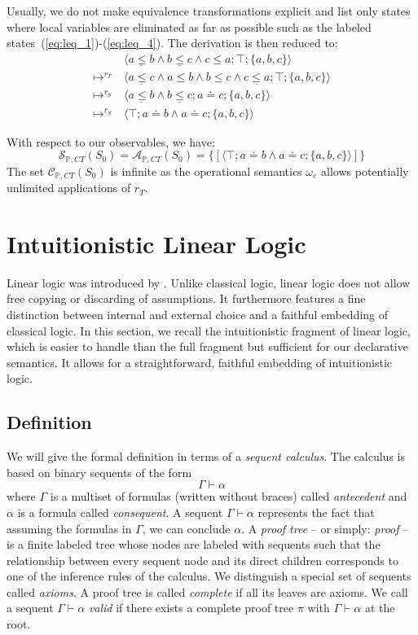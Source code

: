 \documentclass[acmtocl]{acmtrans2m}
\newcommand\state[1]{\langle #1 \rangle}
\newcommand{\bbP}{\ensuremath{\mathbb{P}}}
\newcommand{\cA}{\ensuremath{\mathcal{A}}}
\newcommand{\cS}{\ensuremath{\mathcal{S}}}
\newcommand{\cC}{\ensuremath{\mathcal{C}}}
\newcommand{\oesq}{\ensuremath{\omega_{e}}}
\begin{document}
\begin{example}
Usually, we do not make equivalence transformations explicit and list only
states where local variables are eliminated as far as possible such as the
labeled states~(\ref{eq:leq_1})-(\ref{eq:leq_4}). The derivation is then reduced
to:
\setcounter{equation}{0}
\begin{align}
& \state{\underline{a\leq b} \wedge \underline{b\leq c} \wedge c\leq a;\top;\{a,b,c\}} \\
\mapsto^{r_T}\: & \state{\underline{a\leq c} \wedge a\leq b \wedge b\leq c \wedge \underline{c\leq
a};\top;\{a,b,c\}} \\
\mapsto^{r_S}\: & \state{\underline{a\leq b} \wedge \underline{b\leq c};a\doteq c;\{a,b,c\}}
\\
\mapsto^{r_S}\: & \state{\top;a\doteq b \wedge a\doteq c;\{a,b,c\}}
\end{align}
\end{example}

With respect to our observables, we have:
\[
\cS_{\bbP,CT}(S_0) = \cA_{\bbP,CT}(S_0) =
\{[\state{\top;a\doteq b\wedge a\doteq c;\{a,b,c\}}]\}
\]
The set $\cC_{\bbP,CT}(S_0)$ is infinite
as the operational semantics $\oesq$ allows potentially unlimited applications of $r_T$.

\section{Intuitionistic Linear Logic}
  \label{sec:ill}

Linear logic was introduced by
. Unlike classical logic, linear logic does
not allow free copying or discarding of assumptions. It furthermore features a fine
distinction between internal and external choice and a faithful embedding of
classical logic. In this section, we recall the intuitionistic fragment of linear
logic, which is easier to handle than the full fragment but sufficient for
our declarative semantics. It allows for a straightforward, faithful embedding of
intuitionistic logic.

\subsection{Definition}

We will give the formal definition in terms of a \emph{sequent calculus}. The
calculus is based on binary sequents of the form \[
  \Gamma \vdash \alpha
\] where $\Gamma$ is a multiset of formulas (written without braces) called
\emph{antecedent} and $\alpha$ is a formula called \emph{consequent}. A sequent
$\Gamma \vdash \alpha$ represents the fact that assuming the formulas in
$\Gamma$, we can conclude $\alpha$. A \emph{proof tree} -- or simply:
\emph{proof} -- is a finite labeled tree whose nodes are labeled with
sequents such that the relationship between every sequent node and its direct
children corresponds to one of the inference rules of the calculus. We
distinguish a special set of sequents called \emph{axioms}. A proof tree is
called \emph{complete} if all its leaves are axioms. We call a sequent
$\Gamma\vdash\alpha$ \emph{valid} if there exists a complete proof tree $\pi$
with $\Gamma\vdash\alpha$ at the root.
\end{document}
